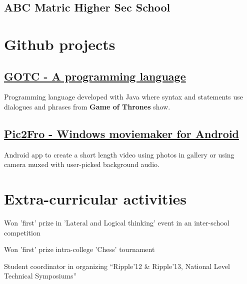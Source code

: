 \documentclass[a4paper]{srika-resume} %
\begin{document}
\begin{minipage}[t]{0.35\textwidth}
\sectionspace %


\subsection{ABC Matric Higher Sec School}


\sectionspace %


\section{Github projects}

\subsection {\href{https://github.com/rsri/GamesOfThronesC}{GOTC - A programming language}}

Programming language developed with Java where syntax and statements use dialogues and phrases from \textbf{Game of Thrones} show.

\sectionspace %

\subsection{\href{https://github.com/rsri/Pic2Fro} {Pic2Fro - Windows moviemaker for Android}}

Android app to create a short length video using photos in gallery or using camera muxed with user-picked background audio.

\sectionspace %


\section{Extra-curricular activities} 
\begin{tightitemizespaced}
\item Won 'first' prize in 'Lateral and Logical thinking' event in an inter-school competition
\item Won 'first' prize intra-college 'Chess' tournament
\item Student coordinator in organizing “Ripple'12 \& Ripple'13, National Level Technical Symposiums”
\end{tightitemizespaced}


\end{minipage}
\end{document}
